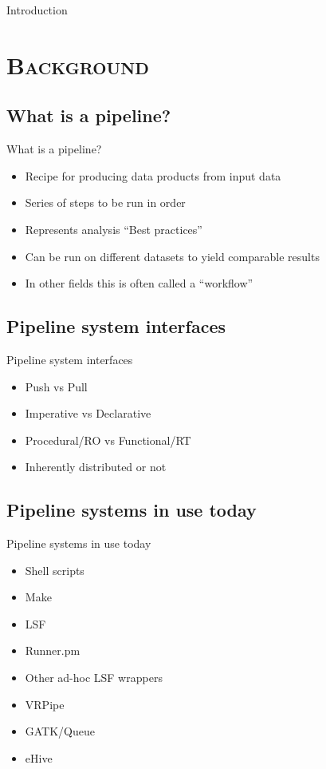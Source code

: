 \documentclass[xcolor=x11names,compress]{beamer}
\renewcommand{\(}{\begin{columns}}
\renewcommand{\)}{\end{columns}}
\newcommand{\<}[1]{\begin{column}{#1}}
\renewcommand{\>}{\end{column}}
\begin{document}
\begin{frame}{Introduction}
\pipesbackground
\tableofcontents
\end{frame}


\section{\scshape Background}


\subsection{What is a pipeline?}
\begin{frame}{What is a pipeline?}
\pipesbackground
\begin{itemize}
\item Recipe for producing data products from input data
\item Series of steps to be run in order
\item Represents analysis ``Best practices''
\item Can be run on different datasets to yield comparable results
\item In other fields this is often called a ``workflow''
\end{itemize}
\end{frame}

\subsection{Pipeline system interfaces}
\begin{frame}{Pipeline system interfaces}
\pipesbackground
\begin{itemize}
\item Push vs Pull
\item Imperative vs Declarative
\item Procedural/RO vs Functional/RT
\item Inherently distributed or not 
\end{itemize}
\end{frame}

\subsection{Pipeline systems in use today}
\begin{frame}{Pipeline systems in use today}
\pipesbackground
\begin{itemize}
\item Shell scripts
\item Make
\item LSF
\item Runner.pm
\item Other ad-hoc LSF wrappers
\item VRPipe
\item GATK/Queue
\item eHive
\end{itemize}
\end{frame}
\end{document}
